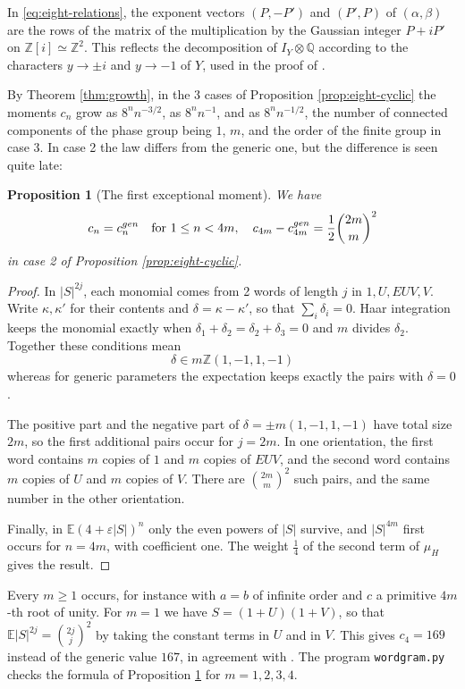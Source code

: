 \documentclass[11pt,reqno]{amsart}
\newtheorem{prop}[thm]{Proposition}
\theoremstyle{definition}
\numberwithin{equation}{section}
\begin{document}
In \eqref{eq:eight-relations}, the exponent vectors $(P,-P')$ and $(P',P)$ of $(\alpha,\beta)$ are the rows of the matrix of the multiplication by the Gaussian integer $P+i P'$ on $\mathbb Z[i]\simeq\mathbb Z^2$. This reflects the decomposition of $I_Y\otimes\mathbb Q$ according to the characters $y\to\pm i$ and $y\to-1$ of $Y$, used in the proof of \cite[Theorem 4.7]{BO26}.

By Theorem \ref{thm:growth}, in the 3 cases of Proposition \ref{prop:eight-cyclic} the moments $c_n$ grow as $8^nn^{-3/2}$, as $8^nn^{-1}$, and as $8^nn^{-1/2}$, the number of connected components of the phase group being $1$, $m$, and the order of the finite group in case 3. In case 2 the law differs from the generic one, but the difference is seen quite late:

\begin{prop}[The first exceptional moment]\label{prop:eight-first-moment}
We have
$$c_n=c_n^{gen}\quad{\rm for}\ 1\leq n<4m,
\quad
c_{4m}-c_{4m}^{gen}=\frac12\binom{2m}m^2$$
in case 2 of Proposition \ref{prop:eight-cyclic}.
\end{prop}

\begin{proof}
In $|S|^{2j}$, each monomial comes from 2 words of length $j$ in $1,U,EUV,V$. Write $\kappa,\kappa'$ for their contents and $\delta=\kappa-\kappa'$, so that $\sum_i\delta_i=0$. Haar integration keeps the monomial exactly when $\delta_1+\delta_2=\delta_2+\delta_3=0$ and $m$ divides $\delta_2$. Together these conditions mean
$$\delta\in m\mathbb Z(1,-1,1,-1)$$
whereas for generic parameters the expectation keeps exactly the pairs with $\delta=0$.

The positive part and the negative part of $\delta=\pm m(1,-1,1,-1)$ have total size $2m$, so the first additional pairs occur for $j=2m$. In one orientation, the first word contains $m$ copies of $1$ and $m$ copies of $EUV$, and the second word contains $m$ copies of $U$ and $m$ copies of $V$. There are $\binom{2m}m^2$ such pairs, and the same number in the other orientation.

Finally, in $\mathbb E(4+\varepsilon|S|)^n$ only the even powers of $|S|$ survive, and $|S|^{4m}$ first occurs for $n=4m$, with coefficient one. The weight $\frac14$ of the second term of $\mu_H$ gives the result.
\end{proof}

Every $m\geq1$ occurs, for instance with $a=b$ of infinite order and $c$ a primitive $4m$-th root of unity. For $m=1$ we have $S=(1+U)(1+V)$, so that $\mathbb E|S|^{2j}=\binom{2j}j^2$ by taking the constant terms in $U$ and in $V$. This gives $c_4=169$ instead of the generic value $167$, in agreement with \cite[Section 4.3]{BO26}. The program \texttt{wordgram.py} checks the formula of Proposition \ref{prop:eight-first-moment} for $m=1,2,3,4$.
\end{document}
